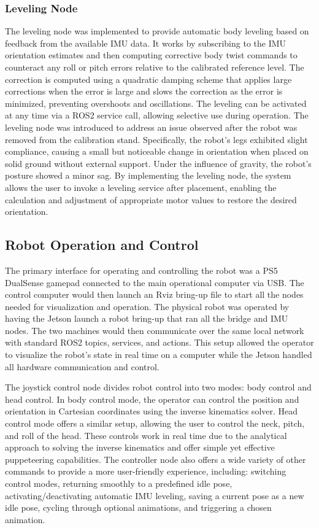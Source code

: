 \subsubsection*{Leveling Node}
The leveling node was implemented to provide automatic body leveling based on feedback from the available IMU data. It works by subscribing to the IMU orientation estimates and then computing corrective body twist commands to counteract any roll or pitch errors relative to the calibrated reference level. The correction is computed using a quadratic damping scheme that applies large corrections when the error is large and slows the correction as the error is minimized, preventing overshoots and oscillations. The leveling can be activated at any time via a ROS2 service call, allowing selective use during operation. The leveling node was introduced to address an issue observed after the robot was removed from the calibration stand. Specifically, the robot’s legs exhibited slight compliance, causing a small but noticeable change in orientation when placed on solid ground without external support. Under the influence of gravity, the robot's posture showed a minor sag. By implementing the leveling node, the system allows the user to invoke a leveling service after placement, enabling the calculation and adjustment of appropriate motor values to restore the desired orientation.

\subsection{Robot Operation and Control}
The primary interface for operating and controlling the robot was a PS5 DualSense gamepad connected to the main operational computer via USB. The control computer would then launch an Rviz bring-up file to start all the nodes needed for visualization and operation. The physical robot was operated by having the Jetson launch a robot bring-up that ran all the bridge and IMU nodes. The two machines would then communicate over the same local network with standard ROS2 topics, services, and actions. This setup allowed the operator to visualize the robot's state in real time on a computer while the Jetson handled all hardware communication and control.

The joystick control node divides robot control into two modes: body control and head control. In body control mode, the operator can control the position and orientation in Cartesian coordinates using the inverse kinematics solver. Head control mode offers a similar setup, allowing the user to control the neck, pitch, and roll of the head. These controls work in real time due to the analytical approach to solving the inverse kinematics and offer simple yet effective puppeteering capabilities. The controller node also offers a wide variety of other commands to provide a more user-friendly experience, including: switching control modes, returning smoothly to a predefined idle pose, activating/deactivating automatic IMU leveling, saving a current pose as a new idle pose, cycling through optional animations, and triggering a chosen animation.  

